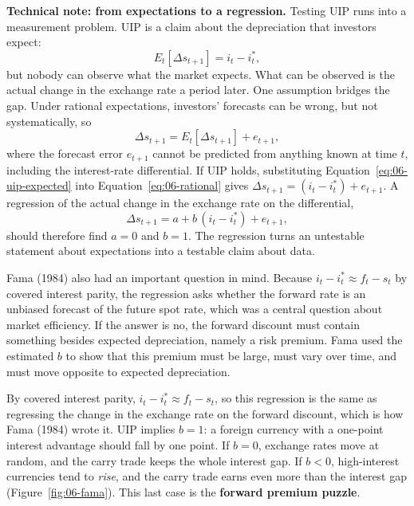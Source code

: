 \begin{technote}
\textbf{Technical note: from expectations to a regression.} Testing UIP runs into a measurement problem. UIP is a claim about the depreciation that investors expect:
\begin{equation}
  E_t[\Delta s_{t+1}] = i_t - i^*_t,
  \label{eq:06-uip-expected}
\end{equation}
but nobody can observe what the market expects. What can be observed is the actual change in the exchange rate a period later. One assumption bridges the gap. Under rational expectations, investors' forecasts can be wrong, but not systematically, so
\begin{equation}
  \Delta s_{t+1} = E_t[\Delta s_{t+1}] + e_{t+1},
  \label{eq:06-rational}
\end{equation}
where the forecast error $e_{t+1}$ cannot be predicted from anything known at time $t$, including the interest-rate differential. If UIP holds, substituting Equation~\eqref{eq:06-uip-expected} into Equation~\eqref{eq:06-rational} gives $\Delta s_{t+1} = (i_t - i^*_t) + e_{t+1}$. A regression of the actual change in the exchange rate on the differential,
\begin{equation}
  \Delta s_{t+1} = a + b\,(i_t - i^*_t) + e_{t+1},
  \label{eq:06-fama}
\end{equation}
should therefore find $a = 0$ and $b = 1$. The regression turns an untestable statement about expectations into a testable claim about data.
\end{technote}

Fama (1984) also had an important question in mind. Because $i_t - i^*_t \approx f_t - s_t$ by covered interest parity, the regression asks whether the forward rate is an unbiased forecast of the future spot rate, which was a central question about market efficiency. If the answer is no, the forward discount must contain something besides expected depreciation, namely a risk premium. Fama used the estimated $b$ to show that this premium must be large, must vary over time, and must move opposite to expected depreciation.

By covered interest parity, $i_t - i^*_t \approx f_t - s_t$, so this regression is the same as regressing the change in the exchange rate on the forward discount, which is how Fama (1984) wrote it. UIP implies $b = 1$: a foreign currency with a one-point interest advantage should fall by one point. If $b = 0$, exchange rates move at random, and the carry trade keeps the whole interest gap. If $b < 0$, high-interest currencies tend to \emph{rise}, and the carry trade earns even more than the interest gap (Figure~\ref{fig:06-fama}). This last case is the \textbf{forward premium puzzle}.

